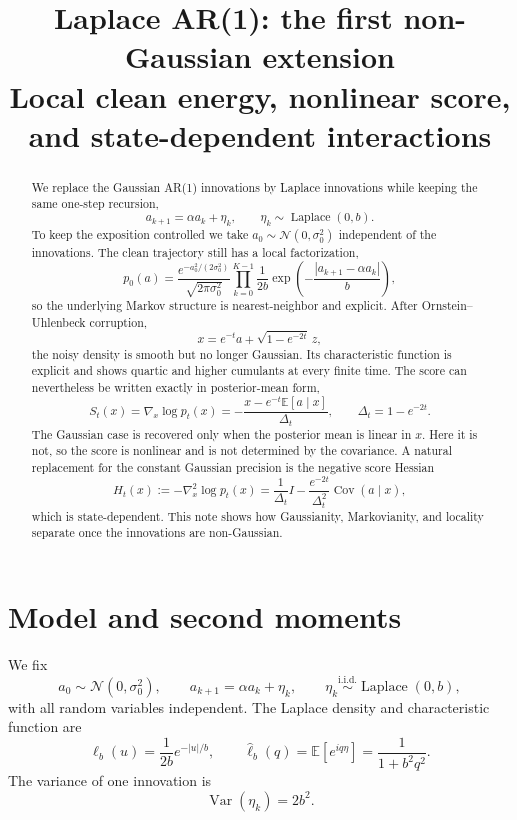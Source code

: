 \documentclass[11pt]{article}
\title{Laplace AR(1): the first non-Gaussian extension\\[2mm]
\large Local clean energy, nonlinear score, and state-dependent interactions}
\author{}
\date{}
\newcommand{\E}{\mathbb{E}}
\newcommand{\Var}{\operatorname{Var}}
\newcommand{\Cov}{\operatorname{Cov}}
\newcommand{\Id}{I}
\newcommand{\Ncal}{\mathcal{N}}
\newcommand{\abs}[1]{\left| #1 \right|}
\newcommand{\Lap}{\operatorname{Laplace}}
\begin{document}
\maketitle

\begin{abstract}
We replace the Gaussian AR(1) innovations by Laplace innovations while keeping the same one-step recursion,
\[
 a_{k+1}=\alpha a_k+\eta_k,
 \qquad
 \eta_k\sim\Lap(0,b).
\]
To keep the exposition controlled we take $a_0\sim\Ncal(0,\sigma_0^2)$ independent of the innovations. The clean trajectory still has a local factorization,
\[
 p_0(a)
 =
 \frac{e^{-a_0^2/(2\sigma_0^2)}}{\sqrt{2\pi\sigma_0^2}}
 \prod_{k=0}^{K-1}\frac{1}{2b}
 \exp\!\left(-\frac{\abs{a_{k+1}-\alpha a_k}}{b}\right),
\]
so the underlying Markov structure is nearest-neighbor and explicit. After Ornstein--Uhlenbeck corruption,
\[
 x=e^{-t}a+\sqrt{1-e^{-2t}}\,z,
\]
the noisy density is smooth but no longer Gaussian. Its characteristic function is explicit and shows quartic and higher cumulants at every finite time. The score can nevertheless be written exactly in posterior-mean form,
\[
 S_t(x)=\nabla_x\log p_t(x)=-\frac{x-e^{-t}\E[a\mid x]}{\Delta_t},
\qquad \Delta_t=1-e^{-2t}.
\]
The Gaussian case is recovered only when the posterior mean is linear in $x$. Here it is not, so the score is nonlinear and is not determined by the covariance. A natural replacement for the constant Gaussian precision is the negative score Hessian
\[
 H_t(x):=-\nabla_x^2\log p_t(x)=\frac{1}{\Delta_t}\Id-\frac{e^{-2t}}{\Delta_t^2}\Cov(a\mid x),
\]
which is state-dependent. This note shows how Gaussianity, Markovianity, and locality separate once the innovations are non-Gaussian.
\end{abstract}

\section{Model and second moments}
We fix
\begin{equation}\label{eq:model}
 a_0\sim\Ncal(0,\sigma_0^2),
 \qquad
 a_{k+1}=\alpha a_k+\eta_k,
 \qquad
 \eta_k\stackrel{\text{i.i.d.}}{\sim}\Lap(0,b),
\end{equation}
with all random variables independent. The Laplace density and characteristic function are
\begin{equation}\label{eq:lap_pdf_cf}
\ell_b(u)=\frac{1}{2b}e^{-\abs{u}/b},
\qquad
\widehat\ell_b(q)=\E[e^{iq\eta}]=\frac{1}{1+b^2q^2}.
\end{equation}
The variance of one innovation is
\begin{equation}\label{eq:lap_var}
\Var(\eta_k)=2b^2.
\end{equation}
\end{document}
